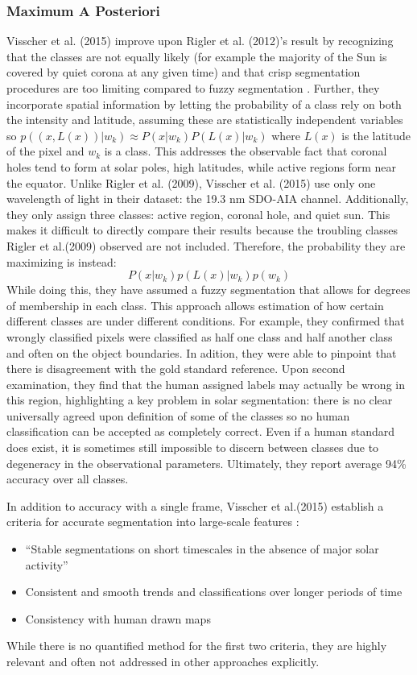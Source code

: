 \documentclass[twoside]{report}
\begin{document}
\subsubsection{Maximum A Posteriori}
Visscher et al. (2015) improve upon Rigler et al. (2012)'s result by recognizing that the classes are not equally likely (for example the majority of the Sun is covered by quiet corona at any given time) and that crisp segmentation procedures are too limiting compared to fuzzy segmentation \cite{visscher:2015}. Further, they incorporate spatial information by letting the probability of a class rely on both the intensity and latitude, assuming these are statistically independent variables so $p((x, L(x)) | w_k) \approx P(x|w_k) P(L(x)|w_k)$ where $L(x)$ is the latitude of the pixel and $w_k$ is a class. This addresses the observable fact that coronal holes tend to form at solar poles, high latitudes, while active regions form near the equator. Unlike Rigler et al. (2009), Visscher et al. (2015) use only one wavelength of light in their dataset: the 19.3 nm SDO-AIA channel. Additionally, they only assign three classes: active region, coronal hole, and quiet sun. This makes it difficult to directly compare their results because the troubling classes Rigler et al.(2009) observed are not included.  Therefore, the probability they are maximizing is instead: 
\[P(x|w_k)p(L(x) | w_k) p(w_k) \]
While doing this, they have assumed a fuzzy segmentation that allows for degrees of membership in each class. This approach allows estimation of how certain different classes are under different conditions. For example, they confirmed that wrongly classified pixels were classified as half one class and half another class and often on the object boundaries. In adition, they were able to pinpoint that there is disagreement with the gold standard reference. Upon second examination, they find that the human assigned labels may actually be wrong in this region, highlighting a key problem in solar segmentation: there is no clear universally agreed upon definition of some of the classes so no human classification can be accepted as completely correct. Even if a human standard does exist, it is sometimes still impossible to discern between classes due to degeneracy in the observational parameters. Ultimately, they report average 94\% accuracy over all classes.

In addition to accuracy with a single frame, Visscher et al.(2015) establish a criteria for accurate segmentation into large-scale features \cite{visscher:2015}:
\begin{itemize}
\item ``Stable segmentations on short timescales in the absence of major solar activity''
\item Consistent and smooth trends and classifications over longer periods of time
\item Consistency with human drawn maps
\end{itemize}
While there is no quantified method for the first two criteria, they are highly relevant and often not addressed in other approaches explicitly. 
\end{document}
